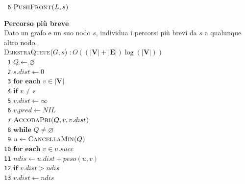 \documentclass[10pt,landscape]{article}
\begin{document}
\begin{multicols*}{4}
\begin{multicols}{2}
                        \verb| 6|\hspace*{0.5em} $\textsc{PushFront($L,s$)}$\\
                \end{multicols}
                \textbf{Percorso più breve}\\ [3pt]
                Dato un grafo e un suo nodo $s$, individua i percorsi più brevi da $s$ a qualunque altro nodo. \\ [3pt]
                \textsc{DijkstraQueue($G,s$)} $: O((|\textbf{V}|+|\textbf{E}|)\log(|\textbf{V}|))$\\ [3pt]
                \verb| 1|\hspace*{0.5em} $Q \leftarrow \varnothing$\\
                \verb| 2|\hspace*{0.5em} $s.dist \leftarrow 0$\\
                \verb| 3|\hspace*{0.5em} $\textbf{for each } v \in |\textbf{V}|$\\
                \verb| 4|\hspace*{1.5em} $\textbf{if } v \ne s$\\
                \verb| 5|\hspace*{2.5em} $v.dist \leftarrow \infty$\\
                \verb| 6|\hspace*{2.5em} $v.pred \leftarrow NIL$\\
                \verb| 7|\hspace*{1.5em} $\textsc{AccodaPri($Q,v,v.dist$)}$\\
                \verb| 8|\hspace*{0.5em} $\textbf{while } Q \ne \varnothing$\\
                \verb| 9|\hspace*{1.5em} $u \leftarrow \textsc{CancellaMin($Q$)}$\\
                \verb|10|\hspace*{1.5em} $\textbf{for each } v \in u.succ$\\
                \verb|11|\hspace*{2.5em} $ndis \leftarrow u.dist + peso(u,v)$\\
                \verb|12|\hspace*{2.5em} $\textbf{if } v.dist > ndis$\\
                \verb|13|\hspace*{3.5em} $v.dist \leftarrow ndis$\\

\end{multicols*}
\end{document}
